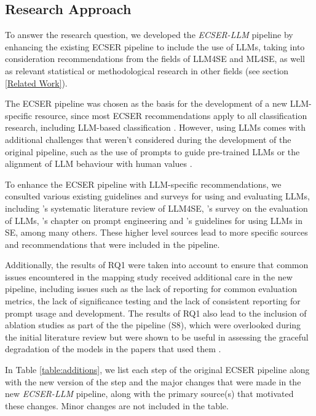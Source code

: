 \documentclass[a4paper]{article}
\newcommand{\newecser}{\textit{ECSER-LLM} }
\begin{document}
\subsection{Research Approach}
To answer the research question, we developed the \newecser pipeline by enhancing the existing ECSER pipeline to include the use of LLMs, taking into consideration recommendations from the fields of LLM4SE and ML4SE, as well as relevant statistical or methodological research in other fields (see section \ref{Related Work}). 

The ECSER pipeline was chosen as the basis for the development of a new LLM-specific resource, since most ECSER recommendations apply to all classification research, including LLM-based classification \cite{Dellanna2022}. However, using LLMs comes with additional challenges that weren't considered during the development of the original pipeline, such as the use of prompts to guide pre-trained LLMs or the alignment of LLM behaviour with human values \cite{liu2024}. 

To enhance the ECSER pipeline with LLM-specific recommendations, we consulted various existing guidelines and surveys for using and evaluating LLMs, including \textcite{hou2024}'s systematic literature review of LLM4SE, \textcite{chang2023}'s survey on the evaluation of LLMs, \textcite{Marvin2024}'s chapter on prompt engineering and \textcite{baltes2025guidelinesempiricalstudiessoftware}'s guidelines for using LLMs in SE, among many others. These higher level sources lead to more specific sources and recommendations that were included in the pipeline.

Additionally, the results of RQ1 were taken into account to ensure that common issues encountered in the mapping study received additional care in the new pipeline, including issues such as the lack of reporting for common evaluation metrics, the lack of significance testing and the lack of consistent reporting for prompt usage and development. The results of RQ1 also lead to the inclusion of ablation studies as part of the the pipeline (S8), which were overlooked during the initial literature review but were shown to be useful in assessing the graceful degradation of the models in the papers that used them \cite{meyes2019ablation}.

In Table \ref{table:additions}, we list each step of the original ECSER pipeline along with the new version of the step and the major changes that were made in the new \newecser pipeline, along with the primary source(s) that motivated these changes. Minor changes are not included in the table.
\end{document}
